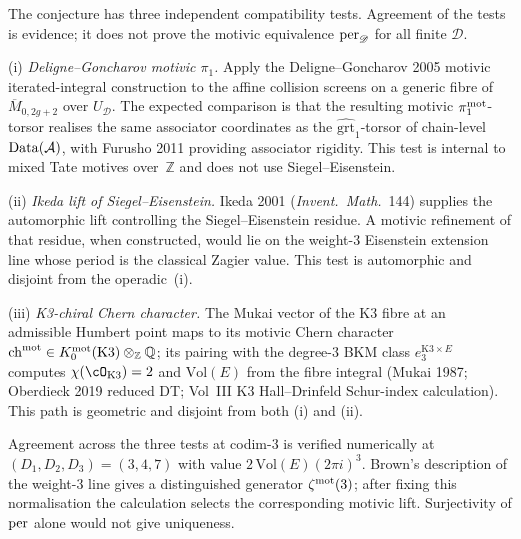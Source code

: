\begin{remark}
\label{rem:motivic-bridge-three-paths}
The conjecture has three independent compatibility tests. Agreement of
the tests is evidence; it does not prove the motivic equivalence
$\mathrm{per}_{\mathscr D}$ for all finite $\mathscr D$.

\textup{(i)} \emph{Deligne--Goncharov motivic $\pi_1$.} Apply the
Deligne--Goncharov 2005 motivic iterated-integral construction to the
affine collision screens on a generic fibre of
$\overline{M}_{0,2g+2}$ over $U_{\mathscr D}$. The expected comparison
is that the
resulting motivic $\pi_1^{\mathrm{mot}}$-torsor realises the same associator
coordinates as the $\widehat{\mathrm{grt}}_1$-torsor of chain-level
$\mathrm{Data}(\mathcal{A})$, with Furusho 2011 providing associator rigidity. This
test is internal to mixed Tate motives over~$\mathbb Z$ and does not
use Siegel--Eisenstein.

\textup{(ii)} \emph{Ikeda lift of Siegel--Eisenstein.} Ikeda 2001
(\emph{Invent.\ Math.}\ 144) supplies the automorphic lift controlling
the Siegel--Eisenstein residue. A motivic refinement of that residue,
when constructed, would lie on the weight-$3$ Eisenstein extension line
whose period is the classical Zagier value. This test is automorphic
and disjoint from the operadic~(i).

\textup{(iii)} \emph{K3-chiral Chern character.} The Mukai vector
of the K3 fibre at an admissible Humbert point maps to its motivic
Chern character $\mathrm{ch}^{\mathrm{mot}}\in
K_0^{\mathrm{mot}}(\mathrm{K3})\otimes_{\mathbb Z}\mathbb Q$; its pairing
with the degree-$3$ BKM class
$e_3^{\mathrm{K3}\times E}$ computes
$\chi(\cO_{\mathrm{K3}}) = 2$ and $\mathrm{Vol}(E)$ from the
fibre integral
(Mukai 1987; Oberdieck 2019 reduced DT; Vol~III K3 Hall--Drinfeld
Schur-index calculation).
This path is geometric and disjoint from both (i) and (ii).

Agreement across the three tests at codim-$3$ is verified
numerically at $(D_1, D_2, D_3) = (3, 4, 7)$ with
value $2\,\mathrm{Vol}(E)(2\pi i)^3$. Brown's description of the
weight-$3$ line gives a distinguished generator
$\zeta^{\mathrm{mot}}(3)$; after fixing this normalisation the calculation
selects the corresponding motivic lift. Surjectivity of $\mathrm{per}$ alone
would not give uniqueness.
\end{remark}


